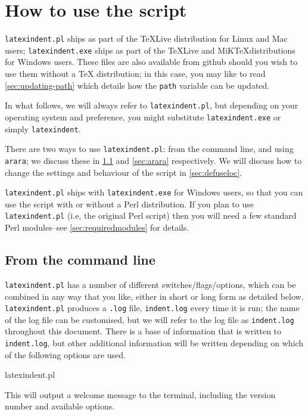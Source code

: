 \section{How to use the script}
\texttt{latexindent.pl} ships as part of the \TeX Live distribution for
Linux and Mac users; \texttt{latexindent.exe} ships as part of the \TeX Live
and MiK\TeX distributions for Windows users. These files are also available
from github \cite{latexindent-home} should you wish to use them without
a \TeX{} distribution; in this case, you may like to read \vref{sec:updating-path}
which details how the \texttt{path} variable can be updated.

In what follows, we will always refer to \texttt{latexindent.pl}, but depending on
your operating system and preference, you might substitute \texttt{latexindent.exe} or
simply \texttt{latexindent}.

There are two ways to use \texttt{latexindent.pl}: from the command line,
and using \texttt{arara}; we discuss these in \cref{sec:commandline} and
\cref{sec:arara} respectively. We will discuss how to change the settings and
behaviour of the script in \vref{sec:defuseloc}.

\texttt{latexindent.pl} ships with \texttt{latexindent.exe} for Windows
users, so that you can use the script with or without a Perl distribution.
If you plan to use \texttt{latexindent.pl} (i.e, the original Perl script) then you will
need a few standard Perl modules--see \vref{sec:requiredmodules} for details.

\subsection{From the command line}\label{sec:commandline}
\texttt{latexindent.pl} has a number of different switches/flags/options, which
can be combined in any way that you like, either in short or long form as detailed below.
\texttt{latexindent.pl}  produces a \texttt{.log} file, \texttt{indent.log} every time it
is run; the name of the log file can be customised, but we will
refer to the log file as \texttt{indent.log} throughout this document.
There is a base of information that is written to \texttt{indent.log},
but other additional information will be written depending
on which of the following options are used.

\begin{commandshell}
latexindent.pl
      \end{commandshell}

This will output a welcome message to the terminal, including the version number
and available options.


